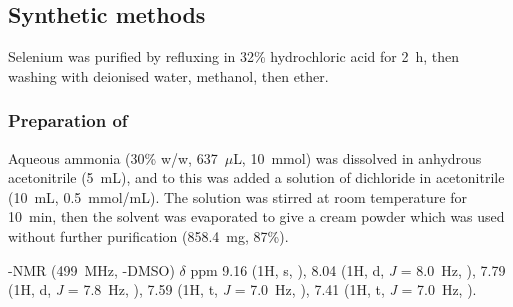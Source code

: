 \begin{refsection}

\subsection{Synthetic methods}

Selenium was purified by refluxing in 32\% hydrochloric acid for 2~h, then washing with deionised water, methanol, then ether.

\subsubsection{Preparation of }
Aqueous ammonia (30\% w/w, 637~$\mu$L, 10~mmol) was dissolved in anhydrous acetonitrile (5~mL), and to this was added a solution of dichloride  in acetonitrile (10~mL, 0.5~mmol/mL).
The solution was stirred at room temperature for 10~min, then the solvent was evaporated to give a cream powder which was used without further purification (858.4~mg, 87\%).\autocite{Weber1976}

-NMR (499~MHz, -DMSO) $\delta$ ppm 9.16 (1H, s, ), 8.04 (1H, d, \textit{J} = 8.0~Hz, ), 7.79 (1H, d, \textit{J} = 7.8~Hz, ), 7.59 (1H, t, \textit{J} = 7.0~Hz, ), 7.41 (1H, t, \textit{J} = 7.0~Hz, ).


\end{refsection}

